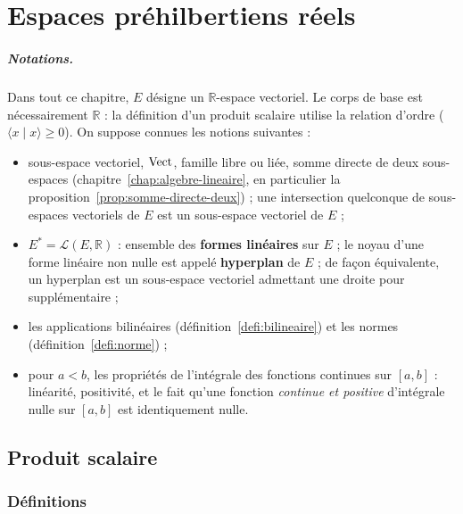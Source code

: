 \chapter{Espaces préhilbertiens réels}
\label{chap:prehilbertiens}

\paragraph{Notations.} Dans tout ce chapitre, $E$ désigne un $\mathbb{R}$-espace vectoriel. Le corps de base est nécessairement $\mathbb{R}$ : la définition d'un produit scalaire utilise la relation d'ordre ($\langle x\mid x\rangle\geq 0$). On suppose connues les notions suivantes :
\begin{itemize}
\item sous-espace vectoriel, $\operatorname{Vect}$, famille libre ou liée, somme directe de deux sous-espaces (chapitre~\ref{chap:algebre-lineaire}, en particulier la proposition~\ref{prop:somme-directe-deux}) ; une intersection quelconque de sous-espaces vectoriels de $E$ est un sous-espace vectoriel de $E$ ;
\item $E^*=\mathcal{L}(E,\mathbb{R})$ : ensemble des \textbf{formes linéaires} sur $E$ ; le noyau d'une forme linéaire non nulle est appelé \textbf{hyperplan} de $E$ ; de façon équivalente, un hyperplan est un sous-espace vectoriel admettant une droite pour supplémentaire ;
\item les applications bilinéaires (définition~\ref{defi:bilineaire}) et les normes (définition~\ref{defi:norme}) ;
\item pour $a<b$, les propriétés de l'intégrale des fonctions continues sur $[a,b]$ : linéarité, positivité, et le fait qu'une fonction \emph{continue et positive} d'intégrale nulle sur $[a,b]$ est identiquement nulle.
\end{itemize}

\section{Produit scalaire}

\subsection{Définitions}

